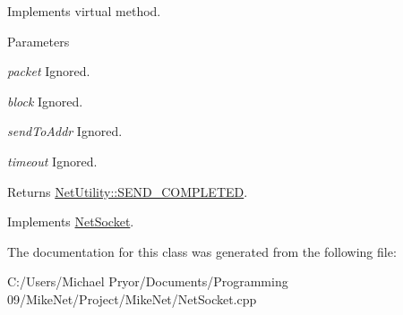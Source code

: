 Implements virtual method. 


\begin{DoxyParams}{Parameters}
\item[{\em packet}]Ignored. \item[{\em block}]Ignored. \item[{\em sendToAddr}]Ignored. \item[{\em timeout}]Ignored.\end{DoxyParams}
\begin{DoxyReturn}{Returns}
\hyperlink{class_net_utility_a8051eca61204ffd818281419bbf44736acec16f03b79a6de35d6ab9d5ceb58ff7}{NetUtility::SEND\_\-COMPLETED}. 
\end{DoxyReturn}


Implements \hyperlink{class_net_socket_a808894184a1eed1a647e1cdf3c015f3a}{NetSocket}.



The documentation for this class was generated from the following file:\begin{DoxyCompactItemize}
\item 
C:/Users/Michael Pryor/Documents/Programming 09/MikeNet/Project/MikeNet/NetSocket.cpp\end{DoxyCompactItemize}
